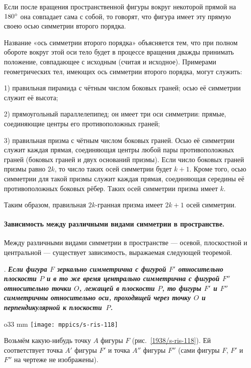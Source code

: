 Если после вращения пространственной фигуры вокруг некоторой прямой на $180\degree$ она совпадает сама с собой, то говорят, что фигура имеет эту прямую своею осью симметрии второго порядка.

Название «ось симметрии второго порядка» объясняется тем, что при полном обороте вокруг этой оси тело будет в процессе вращения дважды принимать положение, совпадающее с исходным (считая и исходное).
Примерами геометрических тел, имеющих ось симметрии второго порядка, могут служить:

1) правильная пирамида с чётным числом боковых граней;
осью её симметрии служит её высота;

2) прямоугольный параллелепипед;
он имеет три оси симметрии: прямые, соединяющие центры его противоположных граней;

3) правильная призма с чётным числом боковых граней.
Осью её симметрии служит каждая прямая, соединяющая центры любой пары противоположных граней (боковых граней и двух оснований призмы).
Если число боковых граней призмы равно $2k$, то число таких осей симметрии будет $k+1$.
Кроме того, осью симметрии для такой призмы служит каждая прямая, соединяющая середины её противоположных боковых рёбер.
Таких осей симметрии призма имеет $k$.

Таким образом, правильная $2k$-гранная призма имеет $2k+1$ осей симметрии.

\paragraph{Зависимость между различными видами симметрии в пространстве.}\label{1938/s102}
Между различными видами симметрии в пространстве — осевой, плоскостной и центральной — существует зависимость, выражаемая следующей теоремой.

\medskip

.
\textbf{\emph{Если фигура $F$ зеркально симметрична с фигурой $F'$ относительно плоскости $P$ и в то же время центрально симметрична с фигурой $F''$ относительно точки $O$, лежащей в плоскости $P$, то фигуры $F'$ и $F''$ симметричны относительно оси, проходящей через точку $O$ и перпендикулярной к плоскости~$P$.}}

\begin{wrapfigure}{o}{33 mm}
\vskip-0mm
\centering
\texttt{[image: mppics/s-ris-118]}
\caption{}\label{1938/s-ris-118}
\vskip-0mm
\end{wrapfigure}

Возьмём какую-нибудь точку $A$ фигуры $F$ (рис.~\ref{1938/s-ris-118}).
Ей соответствует точка $A'$ фигуры $F'$ и точка $A''$ фигуры $F''$ (сами фигуры $F$, $F'$ и $F''$ на чертеже не изображены).

